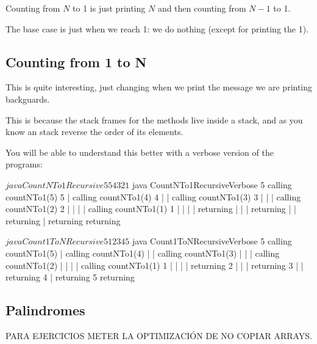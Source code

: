 \documentclass[a4paper, 9pt]{extarticle}
\begin{document}
Counting from $N$ to 1 is just printing $N$ and then counting from $N-1$ to 1.

The base case is just when we reach 1: we do nothing (except for printing the 1).

\subsection{Counting from 1 to N}

\begin{multicols}{2}
\columnbreak
\end{multicols}

This is quite interesting, just changing when we print the message we are
printing backguards.

This is because the stack frames for the methods live inside a stack, and as
you know an stack reverse the order of its elements.

You will be able to understand this better with a verbose version of the programs:

\newpage

\begin{multicols}{2}
  \begin{blackboard}
$ java CountNTo1Recursive 5
5
4
3
2
1
$ java CountNTo1RecursiveVerbose 5
calling countNTo1(5)
5
|  calling countNTo1(4)
4
|  |  calling countNTo1(3)
3
|  |  |  calling countNTo1(2)
2
|  |  |  |  calling countNTo1(1)
1
|  |  |  |  returning
|  |  |  returning
|  |  returning
|  returning
returning
\end{blackboard}
\columnbreak
  \begin{blackboard}
$ java Count1ToNRecursive 5
1
2
3
4
5
$ java Count1ToNRecursiveVerbose 5
calling countNTo1(5)
|  calling countNTo1(4)
|  |  calling countNTo1(3)
|  |  |  calling countNTo1(2)
|  |  |  |  calling countNTo1(1)
1
|  |  |  |  returning
2
|  |  |  returning
3
|  |  returning
4
|  returning
5
returning
\end{blackboard}
\end{multicols}



\subsection{Palindromes}

PARA EJERCICIOS METER LA OPTIMIZACIÓN DE NO COPIAR ARRAYS.
\end{document}
